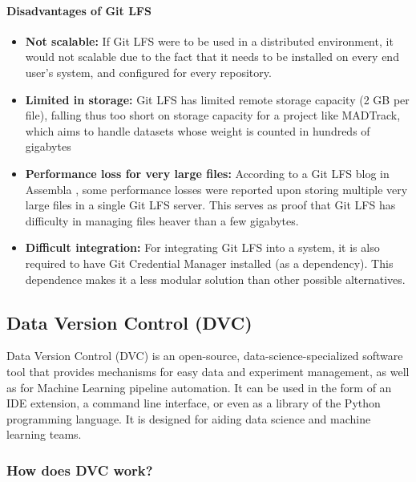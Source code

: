 \paragraph{Disadvantages of Git LFS}

\begin{itemize}

    \item \textbf{Not scalable:} If Git LFS were to be used in a distributed environment, it would not scalable due to the fact that it needs to be installed on every end user's
    system, and configured for every repository.

    \item \textbf{Limited in storage:} Git LFS has limited remote storage capacity (2 GB per file), falling thus too short on storage capacity for a project like MADTrack, which
    aims to handle datasets whose weight is counted in hundreds of gigabytes

    \item \textbf{Performance loss for very large files:} According to a Git LFS blog in Assembla \cite{assemblagitlfs}, some performance losses were reported upon storing 
    multiple very large files in a single Git LFS server. This serves as proof that Git LFS has difficulty in managing files heaver than a few gigabytes.

    \item \textbf{Difficult integration:} For integrating Git LFS into a system, it is also required to have Git Credential Manager installed (as a dependency).
    This dependence makes it a less modular solution than other possible alternatives.

\end{itemize}

\subsection{Data Version Control (DVC)}

Data Version Control (DVC) is an open-source, data-science-specialized software tool that provides mechanisms for easy data and experiment management, as well as 
for Machine Learning pipeline automation. It can be used in the form of an \acrfull{IDE} extension, a command line interface, or even as a library of the Python
programming language. It is designed for aiding data science and machine learning teams.

\subsubsection{How does DVC work?}

